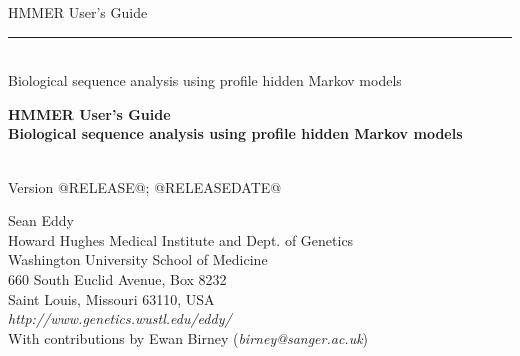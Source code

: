 \begin{titlepage}
{\Large

\vspace*{\fill}

\begin{latexonly}
\noindent
{\Huge \textsf{HMMER User's Guide}} \\ 
\rule[2pt]{\textwidth}{1pt} \\
\hspace*{\fill} {\large \textsf{Biological sequence analysis using
profile hidden Markov models} \\ }
\end{latexonly}

\begin{htmlonly}
\begin{center}
{\Huge \textbf{HMMER User's Guide}}\\
{\large \textbf{Biological sequence analysis using
profile hidden Markov models}}\\
\end{center}
\end{htmlonly}

\vspace*{\fill}

\begin{center}
\textsl{}\\
Version @RELEASE@; @RELEASEDATE@ \\ 

\vspace*{\fill}

Sean Eddy\\
Howard Hughes Medical Institute and Dept. of Genetics\\
Washington University School of Medicine\\
660 South Euclid Avenue, Box 8232\\
Saint Louis, Missouri 63110, USA\\
\textsl{http://www.genetics.wustl.edu/eddy/} \\
With contributions by Ewan Birney (\textsl{birney@sanger.ac.uk})\\
\end{center}

\vspace*{\fill}

}
\end{titlepage}
